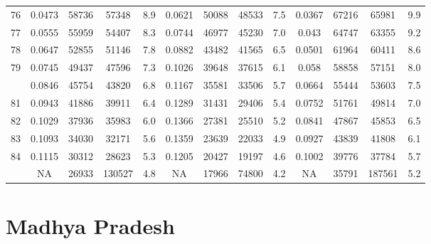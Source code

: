 \documentclass[
  14pt,
]{article}
\begin{document}
\begin{longtable}[t]{lcccccccccccc}
76 & 0.0473 & 58736 & 57348 & 8.9 & 0.0621 & 50088 & 48533 & 7.5 & 0.0367 & 67216 & 65981 & 9.9\\
77 & 0.0555 & 55959 & 54407 & 8.3 & 0.0744 & 46977 & 45230 & 7.0 & 0.043 & 64747 & 63355 & 9.2\\
78 & 0.0647 & 52855 & 51146 & 7.8 & 0.0882 & 43482 & 41565 & 6.5 & 0.0501 & 61964 & 60411 & 8.6\\
79 & 0.0745 & 49437 & 47596 & 7.3 & 0.1026 & 39648 & 37615 & 6.1 & 0.058 & 58858 & 57151 & 8.0\\
\addlinespace
80 & 0.0846 & 45754 & 43820 & 6.8 & 0.1167 & 35581 & 33506 & 5.7 & 0.0664 & 55444 & 53603 & 7.5\\
81 & 0.0943 & 41886 & 39911 & 6.4 & 0.1289 & 31431 & 29406 & 5.4 & 0.0752 & 51761 & 49814 & 7.0\\
82 & 0.1029 & 37936 & 35983 & 6.0 & 0.1366 & 27381 & 25510 & 5.2 & 0.0841 & 47867 & 45853 & 6.5\\
83 & 0.1093 & 34030 & 32171 & 5.6 & 0.1359 & 23639 & 22033 & 4.9 & 0.0927 & 43839 & 41808 & 6.1\\
84 & 0.1115 & 30312 & 28623 & 5.3 & 0.1205 & 20427 & 19197 & 4.6 & 0.1002 & 39776 & 37784 & 5.7\\
\addlinespace
85 & NA & 26933 & 130527 & 4.8 & NA & 17966 & 74800 & 4.2 & NA & 35791 & 187561 & 5.2\\*
\end{longtable}

\pagebreak

\hypertarget{madhya-pradesh}{%
\section{Madhya Pradesh}\label{madhya-pradesh}}
\end{document}
